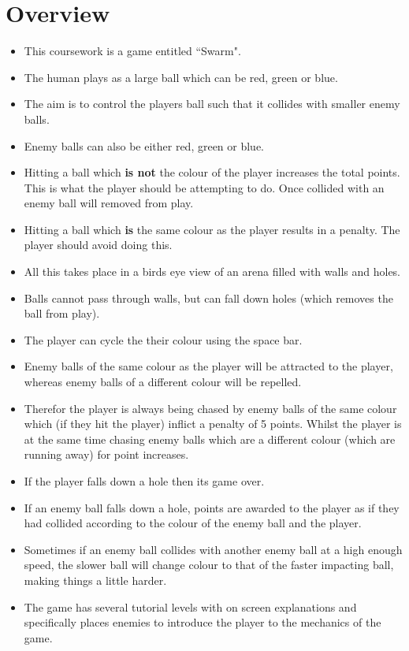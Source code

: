 \section{Overview}

\begin{itemize}
	\item This coursework is a game entitled ``Swarm".
	\item The human plays as a large ball which can be red, green or blue.
	\item The aim is to control the players ball such that it collides with smaller enemy balls.
	\item Enemy balls can also be either red, green or blue.
	\item Hitting a ball which {\bf is not} the colour of the player increases the total points. This is what the player should be attempting to do. Once collided with an enemy ball will removed from play.
	\item Hitting a ball which {\bf is} the same colour as the player results in a penalty. The player should avoid doing this.
	\item All this takes place in a birds eye view of an arena filled with walls and holes.
	\item Balls cannot pass through walls, but can fall down holes (which removes the ball from play).
	\item The player can cycle the their colour using the space bar.
	\item Enemy balls of the same colour as the player will be attracted to the player, whereas enemy balls of a different colour will be repelled.
	\item Therefor the player is always being chased by enemy balls of the same colour which (if they hit the player) inflict a penalty of 5 points. Whilst the player is at the same time chasing enemy balls which are a different colour (which are running away) for point increases.
	\item If the player falls down a hole then its game over.
	\item If an enemy ball falls down a hole, points are awarded to the player as if they had collided according to the colour of the enemy ball and the player.
	\item Sometimes if an enemy ball collides with another enemy ball at a high enough speed, the slower ball will change colour to that of the faster impacting ball, making things a little harder.
	\item The game has several tutorial levels with on screen explanations and specifically places enemies to introduce the player to the mechanics of the game.

\end{itemize}
